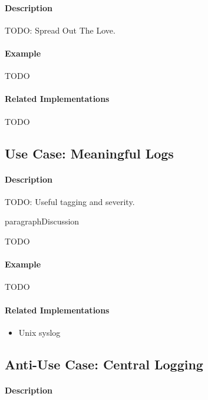 \paragraph{Description}

{\Large TODO:} Spread Out The Love.

\paragraph{Example}

{\Large TODO}

\paragraph{Related Implementations}

{\Large TODO}

\subsection{Use Case: Meaningful Logs}

\paragraph{Description}

{\Large TODO:} Useful tagging and severity.

paragraph{Discussion}

{\Large TODO}

\paragraph{Example}

{\Large TODO}

\paragraph{Related Implementations}

\begin{itemize}
	\item Unix\texttrademark{} syslog
\end{itemize}

\subsection{Anti-Use Case: Central Logging}

\paragraph{Description}

